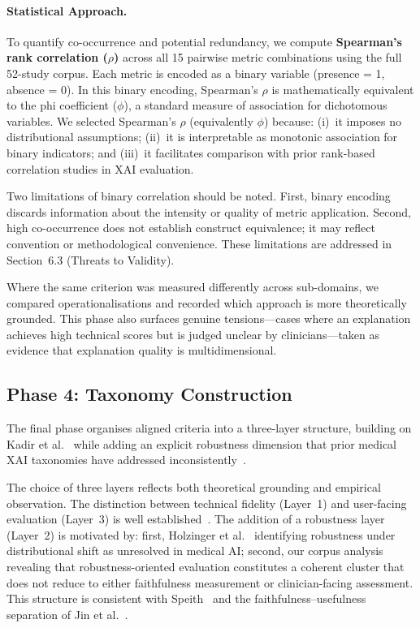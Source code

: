 \paragraph{Statistical Approach.}
To quantify co-occurrence and potential redundancy, we compute \textbf{Spearman's rank correlation ($\rho$)} across all 15 pairwise metric combinations using the full 52-study corpus. Each metric is encoded as a binary variable (presence = 1, absence = 0). In this binary encoding, Spearman's $\rho$ is mathematically equivalent to the phi coefficient ($\phi$), a standard measure of association for dichotomous variables. We selected Spearman's $\rho$ (equivalently $\phi$) because: (i)~it imposes no distributional assumptions; (ii)~it is interpretable as monotonic association for binary indicators; and (iii)~it facilitates comparison with prior rank-based correlation studies in XAI evaluation.

Two limitations of binary correlation should be noted. First, binary encoding discards information about the intensity or quality of metric application. Second, high co-occurrence does not establish construct equivalence; it may reflect convention or methodological convenience. These limitations are addressed in Section~6.3 (Threats to Validity).

Where the same criterion was measured differently across sub-domains, we compared operationalisations and recorded which approach is more theoretically grounded. This phase also surfaces genuine tensions---cases where an explanation achieves high technical scores but is judged unclear by clinicians---taken as evidence that explanation quality is multidimensional.

\subsection{Phase 4: Taxonomy Construction}

The final phase organises aligned criteria into a three-layer structure, building on Kadir et al.~\cite{kadir2023evaluation} while adding an explicit robustness dimension that prior medical XAI taxonomies have addressed inconsistently~\cite{speith2022review,jin2023guidelines}.

The choice of three layers reflects both theoretical grounding and empirical observation. The distinction between technical fidelity (Layer~1) and user-facing evaluation (Layer~3) is well established~\cite{jin2023guidelines,kadir2023evaluation}. The addition of a robustness layer (Layer~2) is motivated by: first, Holzinger et al.~\cite{holzinger2022information} identifying robustness under distributional shift as unresolved in medical AI; second, our corpus analysis revealing that robustness-oriented evaluation constitutes a coherent cluster that does not reduce to either faithfulness measurement or clinician-facing assessment. This structure is consistent with Speith~\cite{speith2022review} and the faithfulness--usefulness separation of Jin et al.~\cite{jin2023guidelines}.

